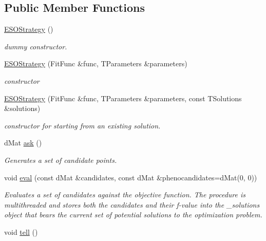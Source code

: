 \subsection*{Public Member Functions}
\begin{DoxyCompactItemize}
\item 
\hypertarget{classlibcmaes_1_1ESOStrategy_aeae9653bf7cec51980c239200ad5c3df}{\hyperlink{classlibcmaes_1_1ESOStrategy_aeae9653bf7cec51980c239200ad5c3df}{E\-S\-O\-Strategy} ()}\label{classlibcmaes_1_1ESOStrategy_aeae9653bf7cec51980c239200ad5c3df}

\begin{DoxyCompactList}\small\item\em dummy constructor. \end{DoxyCompactList}\item 
\hyperlink{classlibcmaes_1_1ESOStrategy_a3736c9ce43cf708675229ff7b3ae4166}{E\-S\-O\-Strategy} (Fit\-Func \&func, T\-Parameters \&parameters)
\begin{DoxyCompactList}\small\item\em constructor \end{DoxyCompactList}\item 
\hyperlink{classlibcmaes_1_1ESOStrategy_abb06d0491f0240f875f66e9a4863f467}{E\-S\-O\-Strategy} (Fit\-Func \&func, T\-Parameters \&parameters, const T\-Solutions \&solutions)
\begin{DoxyCompactList}\small\item\em constructor for starting from an existing solution. \end{DoxyCompactList}\item 
d\-Mat \hyperlink{classlibcmaes_1_1ESOStrategy_af614d71ca3e8353b3027723220c9e3b4}{ask} ()
\begin{DoxyCompactList}\small\item\em Generates a set of candidate points. \end{DoxyCompactList}\item 
void \hyperlink{classlibcmaes_1_1ESOStrategy_a5e2e44bd0808efa95feea7ff5ef7eb91}{eval} (const d\-Mat \&candidates, const d\-Mat \&phenocandidates=d\-Mat(0, 0))
\begin{DoxyCompactList}\small\item\em Evaluates a set of candidates against the objective function. The procedure is multithreaded and stores both the candidates and their f-\/value into the \-\_\-solutions object that bears the current set of potential solutions to the optimization problem. \end{DoxyCompactList}\item 
\hypertarget{classlibcmaes_1_1ESOStrategy_ad35926877abdaed3922b316f57723612}{void \hyperlink{classlibcmaes_1_1ESOStrategy_ad35926877abdaed3922b316f57723612}{tell} ()}\label{classlibcmaes_1_1ESOStrategy_ad35926877abdaed3922b316f57723612}


\end{DoxyCompactItemize}
